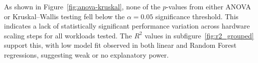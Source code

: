 As shown in Figure~\ref{fig:anova-kruskal}, none of the $p$-values from either ANOVA or Kruskal--Wallis testing fell below the $\alpha = 0.05$ significance threshold. This indicates a lack of statistically significant performance variation across hardware scaling steps for all workloads tested. The $R^2$ values in subfigure~\ref{fig:r2_grouped} support this, with low model fit observed in both linear and Random Forest regressions, suggesting weak or no explanatory power.

